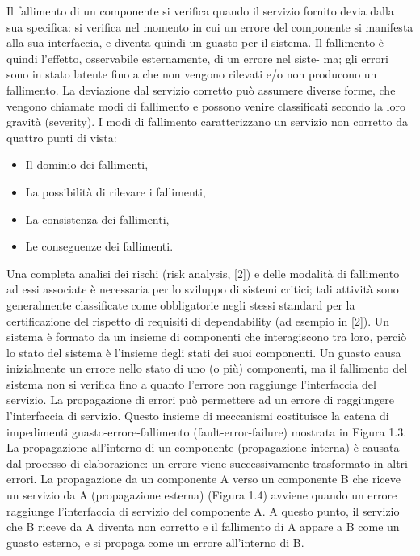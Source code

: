 \documentclass[14pt]{extarticle}
\begin{document}
Il fallimento di un componente si verifica quando il servizio fornito devia
dalla sua specifica: si verifica nel momento in cui un errore del componente
si manifesta alla sua interfaccia, e diventa quindi un guasto per il sistema. Il
fallimento è quindi l’effetto, osservabile esternamente, di un errore nel siste-
ma; gli errori sono in stato latente fino a che non vengono rilevati e/o non
producono un fallimento.
La deviazione dal servizio corretto può assumere diverse forme, che vengono chiamate modi di fallimento e possono venire classificati secondo la loro
gravità (severity). I modi di fallimento caratterizzano un servizio non corretto
da quattro punti di vista:
\begin{itemize}

\item Il dominio dei fallimenti,
\item La possibilità di rilevare i fallimenti,
\item La consistenza dei fallimenti,
\item Le conseguenze dei fallimenti.
\end{itemize}
Una completa analisi dei rischi (risk analysis, [2]) e delle modalità di fallimento ad essi associate è necessaria per lo sviluppo di sistemi critici; tali
attività sono generalmente classificate come obbligatorie negli stessi standard
per la certificazione del rispetto di requisiti di dependability (ad esempio in
[2]).
Un sistema è formato da un insieme di componenti che interagiscono tra
loro, perciò lo stato del sistema è l’insieme degli stati dei suoi componenti. Un
guasto causa inizialmente un errore nello stato di uno (o più) componenti, ma
il fallimento del sistema non si verifica fino a quanto l’errore non raggiunge l’interfaccia del servizio. La propagazione di errori può permettere ad un errore
di raggiungere l’interfaccia di servizio. Questo insieme di meccanismi costituisce la catena di impedimenti guasto-errore-fallimento (fault-error-failure)
mostrata in Figura 1.3.
La propagazione all’interno di un componente (propagazione interna) è
causata dal processo di elaborazione: un errore viene successivamente trasformato in altri errori. La propagazione da un componente A verso un componente B che riceve un servizio da A (propagazione esterna) (Figura 1.4) avviene
quando un errore raggiunge l’interfaccia di servizio del componente A. A questo punto, il servizio che B riceve da A diventa non corretto e il fallimento di
A appare a B come un guasto esterno, e si propaga come un errore all’interno
di B.
\end{document}
